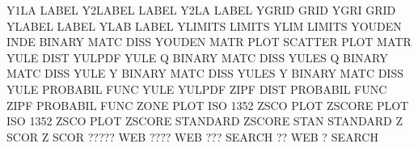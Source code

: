 Y1LA                                    LABEL
Y2LABEL                                 LABEL
Y2LA                                    LABEL
YGRID                                   GRID
YGRI                                    GRID
YLABEL                                  LABEL
YLAB                                    LABEL
YLIMITS                                 LIMITS
YLIM                                    LIMITS
YOUDEN   INDE                           BINARY   MATC DISS
YOUDEN   MATR PLOT                      SCATTER  PLOT MATR
YULE     DIST                           YULPDF
YULE     Q                              BINARY   MATC DISS
YULES    Q                              BINARY   MATC DISS
YULE     Y                              BINARY   MATC DISS
YULES    Y                              BINARY   MATC DISS
YULE                                    PROBABIL FUNC
YULE                                    YULPDF
ZIPF     DIST                           PROBABIL FUNC
ZIPF                                    PROBABIL FUNC
ZONE     PLOT                           ISO      1352 ZSCO PLOT
ZSCORE   PLOT                           ISO      1352 ZSCO PLOT
ZSCORE                                  STANDARD
ZSCORE   STAN                           STANDARD
Z        SCOR                           Z        SCOR
?????                                   WEB
????                                    WEB
???                                     SEARCH
??                                      WEB
?                                       SEARCH

